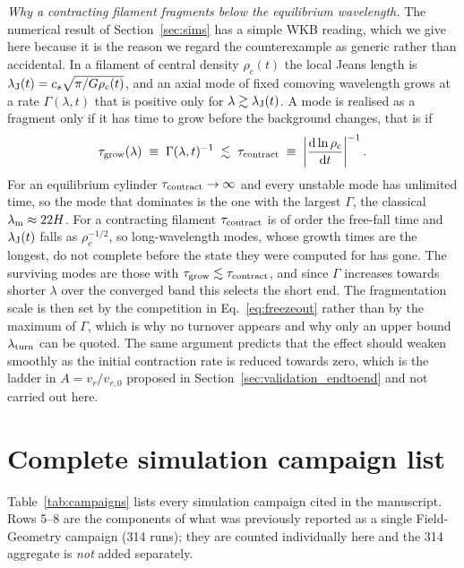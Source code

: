 \documentclass[usenatbib,twoside,twocolumn]{mnras}
\begin{document}
\emph{Why a contracting filament fragments below the equilibrium wavelength.} The numerical result of Section~\ref{sec:sims} has a simple WKB reading, which we give here because it is the reason we regard the counterexample as generic rather than accidental. In a filament of central density $\rho_c(t)$ the local Jeans length is $\lambda_{\rm J}(t)=c_s\sqrt{\pi/G\rho_c(t)}$, and an axial mode of fixed comoving wavelength grows at a rate $\Gamma(\lambda,t)$ that is positive only for $\lambda\gtrsim\lambda_{\rm J}(t)$. A mode is realised as a fragment only if it has time to grow before the background changes, that is if
\begin{equation}
\tau_{\rm grow}(\lambda)\;\equiv\;\Gamma(\lambda,t)^{-1}\;\lesssim\;\tau_{\rm contract}\;\equiv\;\left|\frac{\rm d\ln\rho_c}{{\rm d}t}\right|^{-1}.
\label{eq:freezeout}
\end{equation}
For an equilibrium cylinder $\tau_{\rm contract}\to\infty$ and every unstable mode has unlimited time, so the mode that dominates is the one with the largest $\Gamma$, the classical $\lambda_{\rm m}\approx22H$. For a contracting filament $\tau_{\rm contract}$ is of order the free-fall time and $\lambda_{\rm J}(t)$ falls as $\rho_c^{-1/2}$, so long-wavelength modes, whose growth times are the longest, do not complete before the state they were computed for has gone. The surviving modes are those with $\tau_{\rm grow}\lesssim\tau_{\rm contract}$, and since $\Gamma$ increases towards shorter $\lambda$ over the converged band this selects the short end. The fragmentation scale is then set by the competition in Eq.~\ref{eq:freezeout} rather than by the maximum of $\Gamma$, which is why no turnover appears and why only an upper bound $\lambda_{\rm turn}$ can be quoted. The same argument predicts that the effect should weaken smoothly as the initial contraction rate is reduced towards zero, which is the ladder in $A=v_r/v_{r,0}$ proposed in Section~\ref{sec:validation_endtoend} and not carried out here.

\section{Complete simulation campaign list}
\label{sec:campaigns}

Table~\ref{tab:campaigns} lists every simulation campaign cited in the manuscript. Rows 5--8 are the components of what was previously reported as a single Field-Geometry campaign (314 runs); they are counted individually here and the 314 aggregate is \emph{not} added separately.
\end{document}
